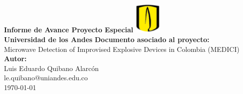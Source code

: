 \documentclass{article}
\begin{document}

\makeatletter{}\makeatother


\begin{titlepage}

\centering

\huge \textbf{Informe de Avance Proyecto Especial}
\vfill
\includegraphics[width=0.1\textwidth]{fotos_portada/uniandes_icon.png}\\
\large \textbf{Universidad de los Andes}
\vfill
\large \textbf{Documento asociado al proyecto:}
\\
\vspace{0.2cm}
\large Microwave Detection of Improvised Explosive Devices in Colombia (MEDICI)
\vfill
\large \textbf{Autor:} 
\\
\vspace{0.2cm}
\large Luis Eduardo Quibano Alarcón \\ le.quibano@uniandes.edu.co\\
\vfill
\large \today
\end{titlepage}



\thispagestyle{empty}
\pagestyle{fancy}
\tableofcontents
\newpage
\lstlistoflistings
{}

\newpage












\end{document}
